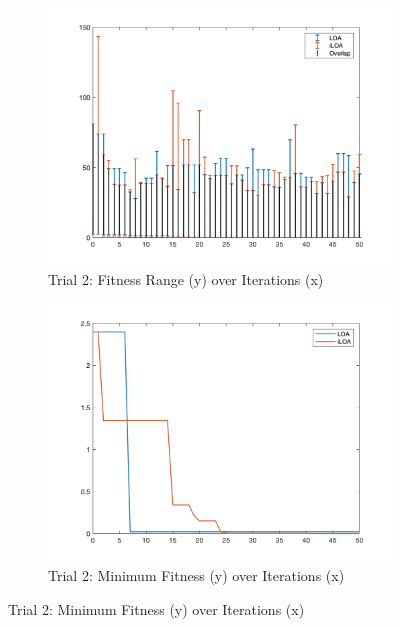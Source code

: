\begin{figure}
  \begin{subfigure}[b]{0.4\textwidth}
    \includegraphics[width=\textwidth]{img/bars/f4/2}
    \caption{ \scriptsize Trial 2: Fitness Range (y) over Iterations (x)}
    \label{fig:f4-b-2}
  \end{subfigure}
  \begin{subfigure}[b]{0.4\textwidth}
    \includegraphics[width=\textwidth]{img/fits/f4/2}
    \caption{ \scriptsize Trial 2: Minimum Fitness (y) over Iterations (x)}
    \label{fig:f4-f-2}
  \end{subfigure}


\end{figure}
